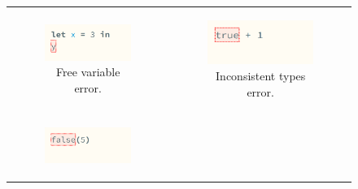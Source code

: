 \begin{figure}[htbp]
  \begin{tabular}[b]{cc}
    \begin{subfigure}[b]{0.3\columnwidth}
      \includegraphics[width=\columnwidth]{images/haz3l-unbound-variable.png}
      \caption{Free variable error.}
      \label{fig:calculus-examples-free}
    \end{subfigure}
    &
    \begin{subfigure}[b]{0.3\columnwidth}
      \includegraphics[width=\columnwidth]{images/haz3l-inconsistent-types.png}
      \caption{Inconsistent types error.}
      \label{fig:calculus-examples-inconsistent-types}
    \end{subfigure} \\
    \begin{subfigure}[b]{0.3\columnwidth}
      \includegraphics[width=\columnwidth]{images/haz3l-ap-non-matched.png}

\end{subfigure}
\end{tabular}
\end{figure}
